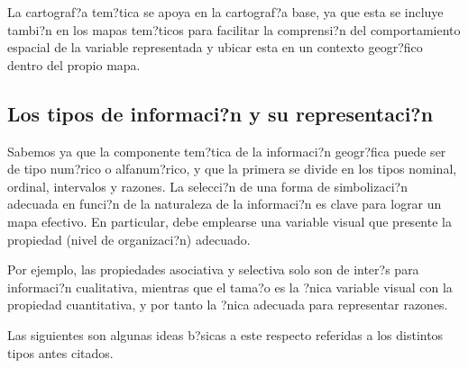 La cartograf?a tem?tica se apoya en la cartograf?a base, ya que esta se incluye tambi?n en los mapas tem?ticos para facilitar la comprensi?n del comportamiento espacial de la variable representada y ubicar esta en un contexto geogr?fico dentro del propio mapa. 


\subsection{Los tipos de informaci?n y su representaci?n}

Sabemos ya que la componente tem?tica de la informaci?n geogr?fica puede ser de tipo num?rico o alfanum?rico, y que la primera se divide en los tipos nominal, ordinal, intervalos y razones.  La selecci?n de una forma de simbolizaci?n adecuada en funci?n de la naturaleza de la informaci?n es clave para lograr un mapa efectivo. En particular, debe emplearse una variable visual que presente la propiedad (nivel de organizaci?n) adecuado. 

Por ejemplo, las propiedades asociativa y selectiva solo son de inter?s para informaci?n cualitativa, mientras que el tama?o es la ?nica variable visual con la propiedad cuantitativa, y por tanto la ?nica adecuada para representar razones.

Las siguientes son algunas ideas b?sicas a este respecto referidas a los distintos tipos antes citados.



